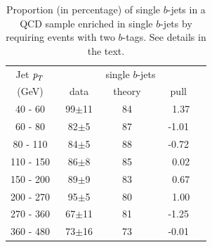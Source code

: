 \begin{table}[!hbt] %
\renewcommand{\arraystretch}{1.2}
\centering
\begin{tabular}{ | c || c | c | c ||}
  \hline
  Jet ${\emph{p}_{T}}$ & \multicolumn{3}{c||}{single $b$-jets}\\ \cline{2-4}
    (GeV) & ~~data~~ & ~theory~ & ~~~pull~~~\\ \hline
   40 - 60 &  99$\pm$11 & 84   & ~1.37 \\  
   60 - 80 &  82$\pm$5  &  87  & -1.01\\ 
   80 - 110&  84$\pm$5  &  88 &  -0.72\\ 
  110 - 150&  86$\pm$8  &  85 &  ~0.02\\ 
  150 - 200&  89$\pm$9  &  83 &  ~0.67 \\ 
  200 - 270&  95$\pm$5  &  80 &  ~1.00 \\ 
  270 - 360&  67$\pm$11  &  81 & -1.25 \\ 
  360 - 480&  73$\pm$16  &  73 & -0.01 \\ \hline
\end{tabular}
\caption{Proportion (in percentage) of single $b$-jets in a QCD sample enriched in single $b$-jets by requiring events with two $b$-tags. See details in the text.} %
\label{tb:fitfractions2btagS}
\end{table}


